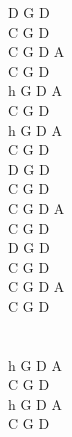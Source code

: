 \documentclass[a5paper, 10pt]{book}
\begin{document}
\begin{minipage}[t]{0.19\textwidth}
D  G D\\
C  G D\\
C G D A\\
C  G D\\

h G D A\\
C G D \\
h G D A\\
C G D \\

D G D \\
C G D \\
C G D A\\
C G D \\

 D G D \\
 C G D \\
 C G D A\\
 C G D \\

~\\~\\
h G D A\\
C G D \\
h G D A\\
C G D \\
\end{minipage}

\newpage
\end{document}
